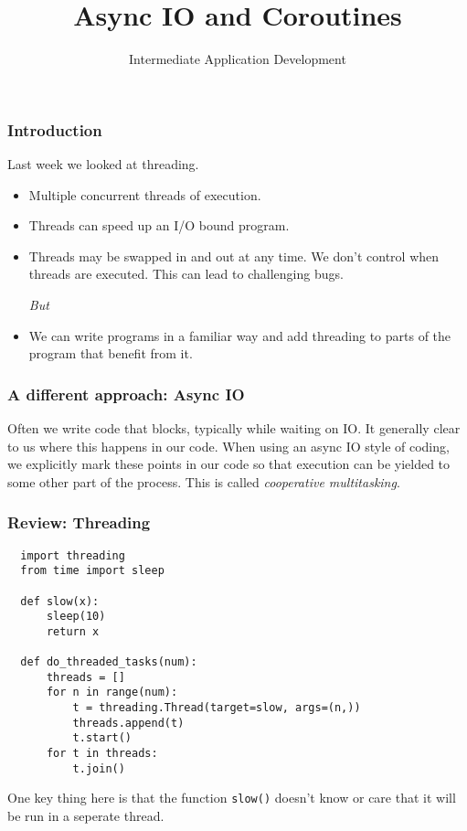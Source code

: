 \documentclass[10pt]{beamer}
\title{Async IO and Coroutines}
\author[IN608]{Intermediate Application Development}
\institute[Otago Polytechnic]{
  Otago Polytechnic \\
  Dunedin, New Zealand \\
  Kaiako: Tom Clark
}
\date{}
\begin{document}
\begin{frame}[plain]
  \titlepage
\end{frame}

\begin{frame}
  \frametitle{Introduction}
  
  Last week we looked at threading.
  \begin{itemize}
    \item Multiple concurrent threads of execution.
    \item Threads can speed up an I/O bound program.  
    \item Threads may be swapped in and out at any time. We don't
    control when threads are executed. This can lead to challenging
    bugs. 
    
    \vspace{3mm}
    \emph{But}
    
    \item We can write programs in a familiar way and add threading
    to parts of the program that benefit from it.
  \end{itemize}  
     
\end{frame}

\begin{frame}
  \frametitle{A different approach: Async IO}

  Often we write code that blocks, typically while waiting on IO. It generally
  clear to us where this happens in our code. When using an async IO style of 
  coding, we explicitly mark these points in our code so that execution can be
  yielded to some other part of the process. This is called \emph{cooperative multitasking}.

\end{frame}

\begin{frame}[fragile]
  \frametitle{Review: Threading}
  
 \begin{verbatim}
  import threading
  from time import sleep
  
  def slow(x):
      sleep(10)
      return x
  
  def do_threaded_tasks(num):
      threads = []
      for n in range(num):
          t = threading.Thread(target=slow, args=(n,))
          threads.append(t)
          t.start() 
      for t in threads:
          t.join()                                                                                                             
 \end{verbatim} 
 One key thing here is that the function \texttt{slow()} doesn't
 know or care that it will be run in a seperate thread.
    
\end{frame}
\end{document}

